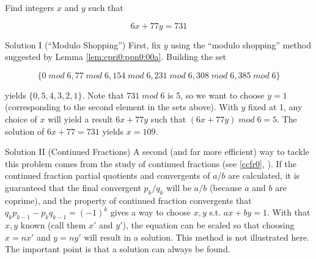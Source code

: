 \begin{vworkexamplestatement}
\label{ex:cpri0:ppn0:01}
Find integers $x$ and $y$ such that

\begin{equation}
6 x + 77 y = 731
\end{equation}
\end{vworkexamplestatement}
\begin{vworkexampleparsection}{Solution I (``Modulo Shopping'')}
First, fix $y$ using the ``modulo shopping'' method
suggested by Lemma \ref{lem:cpri0:ppn0:00a}.  Building
the set

\begin{equation}
\{   0 \; mod \; 6,  77 \; mod \; 6, 154 \; mod \; 6, 
   231 \; mod \; 6, 308 \; mod \; 6, 385 \; mod \; 6 \}
\end{equation}

yields $\{ 0, 5, 4, 3, 2, 1  \}$.  Note that $731 \; mod \; 6$
is 5, so we want to choose $y=1$ (corresponding to the second
element in the sets above).  With $y$ fixed at 1, any choice
of $x$ will yield a result $6x + 77y$ such that
$(6x + 77y) \; mod \; 6 = 5$.  The solution of
$6x + 77 = 731$ yields $x=109$.
\end{vworkexampleparsection}
\begin{vworkexampleparsection}{Solution II (Continued Fractions)}
A second (and far more efficient) way to tackle this problem 
comes from the study of
continued fractions 
(see \ccfrzeroxrefcomma{}\ccfrzeromcclass{} \ref{ccfr0}, 
\emph{\ccfrzeroshorttitle{}}).  If the continued fraction
partial quotients and convergents of $a/b$ are calculated,
it is guaranteed that the final convergent $p_k/q_k$ will be $a/b$
(because $a$ and $b$ are coprime), and the property of 
continued fraction convergents that 
$q_k p_{k-1} - p_k q_{k-1} = (-1)^k$ gives a way to choose
$x, y$ s.t. $ax + by = 1$.  With that $x,y$ known (call them
$x'$ and $y'$), the equation can be scaled so that 
choosing $x=nx'$ and $y=ny'$ will result in a solution.
This method is not illustrated here.  The important point is
that a solution can always be found.
\end{vworkexampleparsection}

